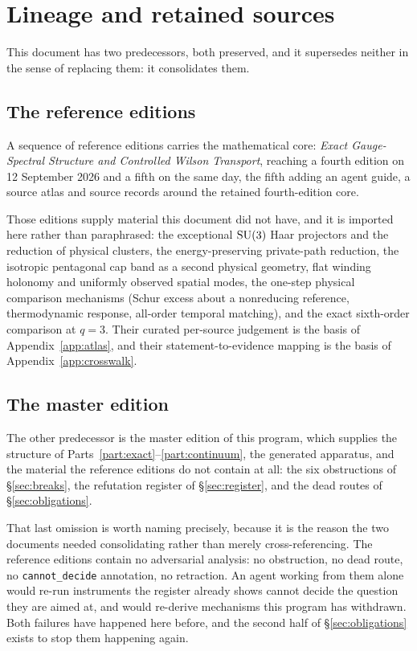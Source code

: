 \section{Lineage and retained sources}
\label{sec:lineage}

This document has two predecessors, both preserved, and it supersedes
neither in the sense of replacing them: it consolidates them.

\subsection{The reference editions}

A sequence of reference editions carries the mathematical core:
\emph{Exact Gauge-Spectral Structure and Controlled Wilson Transport},
reaching a fourth edition on 12 September 2026 and a fifth on the same
day, the fifth adding an agent guide, a source atlas and source
records around the retained fourth-edition core.

Those editions supply material this document did not have, and it is
imported here rather than paraphrased: the exceptional
\(\mathrm{SU}(3)\) Haar projectors and the reduction of physical clusters, the
energy-preserving private-path reduction, the isotropic pentagonal cap
band as a second physical geometry, flat winding holonomy and uniformly
observed spatial modes, the one-step physical comparison mechanisms
(Schur excess about a nonreducing reference, thermodynamic response,
all-order temporal matching), and the exact sixth-order comparison at
\(q = 3\). Their curated per-source judgement is the basis of
Appendix~\ref{app:atlas}, and their statement-to-evidence mapping is
the basis of Appendix~\ref{app:crosswalk}.

\subsection{The master edition}

The other predecessor is the master edition of this program, which
supplies the structure of Parts~\ref{part:exact}--\ref{part:continuum},
the generated apparatus, and the material the reference editions do not
contain at all: the six obstructions of \S\ref{sec:breaks}, the
refutation register of \S\ref{sec:register}, and the dead routes of
\S\ref{sec:obligations}.

That last omission is worth naming precisely, because it is the reason
the two documents needed consolidating rather than merely
cross-referencing. The reference editions contain no adversarial
analysis: no obstruction, no dead route, no \texttt{cannot\_decide}
annotation, no retraction. An agent working from them alone would
re-run instruments the register already shows cannot decide the
question they are aimed at, and would re-derive mechanisms this program
has withdrawn. Both failures have happened here before, and the second
half of \S\ref{sec:obligations} exists to stop them happening again.

